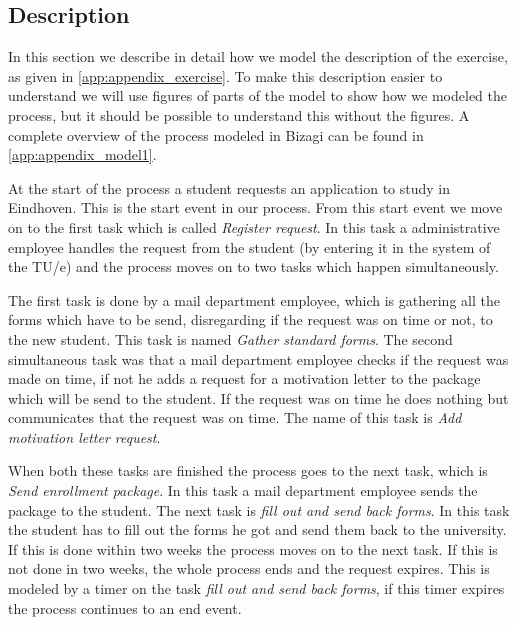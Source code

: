 
\subsection{Description}
In this section we describe in detail how we model the description of the exercise, as given in \autoref{app:appendix_exercise}.
To make this description easier to understand we will use figures of parts of the model to show how we modeled the process, but it should be possible to understand this without the figures.
A complete overview of the process modeled in Bizagi can be found in \autoref{app:appendix_model1}.

At the start of the process a student requests an application to study in Eindhoven.
This is the start event in our process.
From this start event we move on to the first task which is called \emph{Register request}.
In this task a administrative employee handles the request from the student (by entering it in the system of the TU/e) and the process moves on to two tasks which happen simultaneously.

The first task is done by a mail department employee, which is gathering all the forms which have to be send, disregarding if the request was on time or not, to the new student.
This task is named \emph{Gather standard forms}.
The second simultaneous task was that a mail department employee checks if the request was made on time, if not he adds a request for a motivation letter to the package which will be send to the student.
If the request was on time he does nothing but communicates that the request was on time.
The name of this task is \emph{Add motivation letter request}.

When both these tasks are finished the process goes to the next task, which is \emph{Send enrollment package}.
In this task a mail department employee sends the package to the student.
The next task is \emph{fill out and send back forms}.
In this task the student has to fill out the forms he got and send them back to the university.
If this is done within two weeks the process moves on to the next task.
If this is not done in two weeks, the whole process ends and the request expires.
This is modeled by a timer on the task \emph{fill out and send back forms}, if this timer expires the process continues to an end event.

